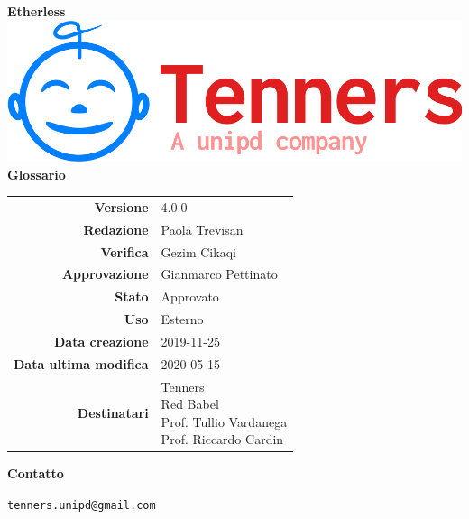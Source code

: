 \begin{titlepage}
	\begin{center}
		\large \textbf{Etherless}
		\vfill
		\includegraphics[scale = 0.3]{./res/img/logo.png}\\
		\vfill
		\Huge \textbf{Glossario}

        \vfill
        \large

        \begin{tabular}{r|l}
                       \textbf{Versione} & 4.0.0 \\
                       \textbf{Redazione} &
                       Paola Trevisan\\
                       \textbf{Verifica} &
                       Gezim Cikaqi \\
                       \textbf{Approvazione} & Gianmarco Pettinato \\
                       \textbf{Stato} & Approvato \\
                       \textbf{Uso} &  Esterno\\
                       \textbf{Data creazione} &  2019-11-25\\
                       \textbf{Data ultima modifica} & 2020-05-15 \\
                       \textbf{Destinatari} & \parbox[t]{5cm}{Tenners \\ Red Babel \\ Prof. Tullio Vardanega\\Prof. Riccardo Cardin}
                \end{tabular}
                \vfill
                \normalsize
                \vfill
                \textbf{Contatto}

                \texttt{tenners.unipd@gmail.com}

	\end{center}
\end{titlepage}

